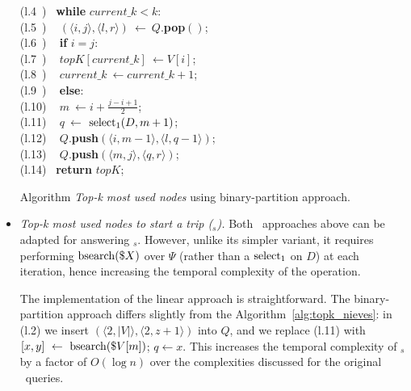 \begin{itemize}
\begin{algorithm}[ht]
\begin{center}
\begin{minipage}{0.70\textwidth}
\begin{code}
					\>(l.4~) \> ~\textbf{while }$current\_k < k$: \\
					\>(l.5~) \> ~\> $ (\langle i,j\rangle, \langle l,r\rangle) ~\leftarrow ~Q.$\textbf{pop$()$}; \\%
					
					\>(l.6~) \> ~\> \textbf{if} $i = j$: \\
					\>(l.7~) \> ~\> \> $ topK[current\_k] ~\leftarrow V[i]$; \\
					\>(l.8~) \> ~\> \> $ current\_k ~\leftarrow current\_k + 1$; \\
					\>(l.9~) \> ~\> \textbf{else}: \\
					\>(l.10) \> ~\> \> $ m ~\leftarrow i + \frac{j - i + 1}{2}$; \\
					\>(l.11) \> ~\> \> $ q ~\leftarrow$ \textbf{$\operatorname{select}_1(D,m + 1)$}; \\
					\>(l.12) \> ~\> \> $ Q .$\textbf{push$(\langle i, m-1 \rangle, \langle l, q-1 \rangle)$}; \\
					\>(l.13) \> ~\> \> $ Q .$\textbf{push$(\langle m, j \rangle, \langle q, r \rangle)$}; \\%
					\>(l.14) \> ~\textbf{return} $topK$; \\
				\end{code}
			\end{minipage}
		\end{center}
		\caption{Algorithm {\em Top-k most used nodes} using binary-partition approach.}
		\label{alg:topk_nieves}
	\end{algorithm}

	\item {\em Top-k most used nodes to start a trip (\topK$_s$).}
	Both \topK\ approaches above can be adapted for answering \topK$_s$.
	However, unlike its simpler variant, it requires performing $\operatorname{bsearch}(\$X)$ over $\Psi$ (rather than a $\operatorname{select}_1$ on $D$) at
	each iteration, hence increasing the temporal complexity of the operation.

	The implementation of the linear approach is straightforward. The binary-partition approach differs slightly 
	from the Algorithm~\ref{alg:topk_nieves}: in (l.2) we insert $(\langle 2, |V| \rangle, \langle 2,z+1 \rangle)$ into $Q$, and we 
	replace (l.11) with $[x,y]~\leftarrow~\operatorname{bsearch}(\$V[m])$; $q \leftarrow x$. This increases the temporal complexity of \topK$_s$ by a factor of $O(\log n)$ over the complexities discussed for the original \topK\ queries.
	\end{itemize}

